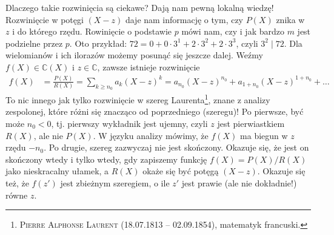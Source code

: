 \documentclass[a4paper,fleqn,9pt]{extarticle}
\begin{document}
Dlaczego takie rozwinięcia są ciekawe?
Dają nam pewną lokalną wiedzę!
Rozwinięcie w potęgi $(X-z)$ daje nam informację o tym, czy $P(X)$ znika w $z$ i do którego rzędu.
Rowinięcie o podstawie $p$ mówi nam, czy i jak bardzo $m$ jest podzielne przez $p$.
Oto przykład: $72 = 0 + 0 \cdot 3^1 + 2\cdot 3^2+ 2\cdot 3^3$, czyli $3^2\mid 72$.
Dla wielomianów i ich ilorazów możemy posunąć się jeszcze dalej. 
Weźmy $f(X) \in \mathbb C(X)$ i $z\in\mathbb C$, zawsze istnieje rozwinięcie
\begin{align*}
f(X) & = \frac{P(X)}{R(X)}
       = \sum_{k\ge n_0} a_k(X-z)^k
       = a_{n_0} (X-z)^{n_0} + a_{1+n_0} (X-z)^{1+n_0} + \dots
\end{align*}
To nic innego jak tylko rozwinięcie w szereg Laurenta\footnote{\textsc{Pierre Alphonse Laurent} (18.07.1813 -- 02.09.1854), matematyk francuski.}, znane z analizy zespolonej, które różni się znacząco od poprzedniego (szeregu)!
Po pierwsze, być może $n_0<0$, tj. pierwszy wykładnik jest ujemny, czyli $z$ jest pierwiastkiem $R(X)$, ale nie $P(X)$.
W języku analizy mówimy, że $f(X)$ ma biegun w $z$ rzędu $-n_0$. 
Po drugie, szereg zazwyczaj nie jest skończony. Okazuje się, że jest on skończony wtedy i tylko wtedy, gdy zapiszemy funkcję $f(X) = P(X)/R(X)$ jako nieskracalny ułamek, a $R(X)$ okaże się być potęgą $(X-z)$.
Okazuje się też, że $f(z')$ jest zbieżnym szeregiem, o ile $z'$ jest prawie (ale nie dokładnie!) równe $z$.
\end{document}
